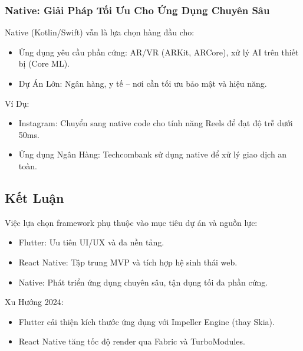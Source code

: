     \subsubsection{Native: Giải Pháp Tối Ưu Cho Ứng Dụng Chuyên Sâu}
    \begin{flushleft}
      \hspace*{0.8cm}Native (Kotlin/Swift) vẫn là lựa chọn hàng đầu cho:
      \setlength{\leftmargini}{1.5cm}
      \begin{itemize}
        \item Ứng dụng yêu cầu phần cứng: AR/VR (ARKit, ARCore), xử lý AI trên thiết bị (Core ML).
        \item Dự Án Lớn: Ngân hàng, y tế – nơi cần tối ưu bảo mật và hiệu năng.
      \end{itemize}
    \end{flushleft}

    \begin{flushleft}
      \hspace*{0.8cm}Ví Dụ:
      \setlength{\leftmargini}{1.5cm}
      \begin{itemize}
          \item Instagram: Chuyển sang native code cho tính năng Reels để đạt độ trễ dưới 50ms.
          \item Ứng dụng Ngân Hàng: Techcombank sử dụng native để xử lý giao dịch an toàn.
      \end{itemize}
    \end{flushleft}

\subsection{Kết Luận}
\renewcommand{\labelitemi}{--}    
\begin{flushleft}
  \hspace*{0.8cm}Việc lựa chọn framework phụ thuộc vào mục tiêu dự án và nguồn lực:
  \setlength{\leftmargini}{1.5cm}
  \begin{itemize}
      \item Flutter: Ưu tiên UI/UX và đa nền tảng.
      \item React Native: Tập trung MVP và tích hợp hệ sinh thái web.
      \item Native: Phát triển ứng dụng chuyên sâu, tận dụng tối đa phần cứng.
  \end{itemize}
\end{flushleft}

\begin{flushleft}
  \hspace*{0.8cm}Xu Hướng 2024:
  \setlength{\leftmargini}{1.5cm}
  \begin{itemize}
      \item Flutter cải thiện kích thước ứng dụng với Impeller Engine (thay Skia).
      \item React Native tăng tốc độ render qua Fabric và TurboModules.
  \end{itemize}
\end{flushleft}